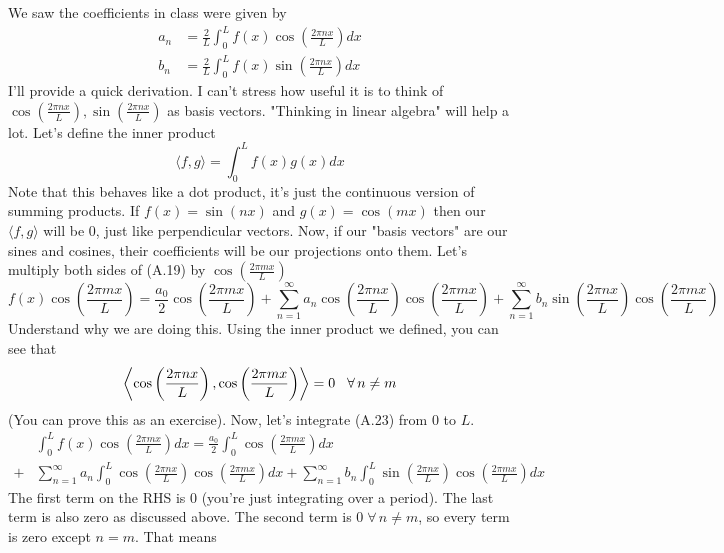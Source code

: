\documentclass{report}
\numberwithin{equation}{section}
\begin{document}
We saw the coefficients in class were given by
\begin{align}
	a_n &= \frac{2}{L}\int_0^L f(x)\cos\left(\frac{2\pi nx}{L}\right)dx\\
	b_n &= \frac{2}{L}\int_0^L f(x)\sin\left(\frac{2\pi nx}{L}\right)dx
\end{align}
I'll provide a quick derivation. I can't stress how useful it is to think of $\cos\left(\frac{2\pi nx}{L}\right), \sin\left(\frac{2\pi nx}{L}\right)$ as basis vectors. "Thinking in linear algebra" will help a lot. Let's define the inner product
\begin{equation}
	\langle f,g\rangle = \int^L_0 f(x)g(x)dx
\end{equation}
Note that this behaves like a dot product, it's just the continuous version of summing products. If $f(x)=\sin(nx)$ and $g(x) =\cos(mx)$ then our $\langle f,g\rangle$ will be 0, just like perpendicular vectors. Now, if our "basis vectors" are our sines and cosines, their coefficients will be our projections onto them. Let's multiply both sides of (A.19) by $\cos\left(\frac{2\pi mx}{L}\right)$
\begin{equation}
	f(x)\cos\left(\frac{2\pi mx}{L}\right) = \frac{a_0}{2}\cos\left(\frac{2\pi mx}{L}\right)+\sum^{\infty}_{n=1}a_n\cos\left(\frac{2\pi nx}{L}\right)\cos\left(\frac{2\pi mx}{L}\right) +\sum^{\infty}_{n=1} b_n\sin\left(\frac{2\pi nx}{L}\right)\cos\left(\frac{2\pi mx}{L}\right)
\end{equation}
Understand why we are doing this. Using the inner product we defined, you can see that
\begin{equation}
	\left\langle \cos\left(\frac{2\pi nx}{L}\right),\cos\left(\frac{2\pi mx}{L}\right)\right\rangle = 0\hspace{0.3cm}\forall\, n\neq m
\end{equation}
(You can prove this as an exercise). Now, let's integrate (A.23) from 0 to $L$.
\begin{align*}
	&\int^L_0f(x)\cos\left(\frac{2\pi mx}{L}\right)dx = \frac{a_0}{2}\int^L_0\cos\left(\frac{2\pi mx}{L}\right)dx\\+&\sum^{\infty}_{n=1}a_n\int^L_0\cos\left(\frac{2\pi nx}{L}\right)\cos\left(\frac{2\pi mx}{L}\right)dx +\sum^{\infty}_{n=1} b_n\int^L_0\sin\left(\frac{2\pi nx}{L}\right)\cos\left(\frac{2\pi mx}{L}\right)dx
\end{align*}
The first term on the RHS is 0 (you're just integrating over a period). The last term is also zero as discussed above. The second term is $0\;\forall\, n\neq m$, so every term is zero except $n=m$. That means
\end{document}

